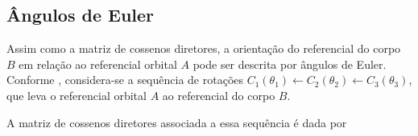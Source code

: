 





\subsection{Ângulos de Euler}
\label{sec_angulos_euler}

Assim como a matriz de cossenos diretores, a orientação do referencial do corpo $B$ em relação ao referencial orbital $A$ pode ser descrita por ângulos de Euler. Conforme \cite{wie2008space}, considera-se a sequência de rotações $C_1(\theta_1)\leftarrow C_2(\theta_2)\leftarrow C_3(\theta_3)$, que leva o referencial orbital $A$ ao referencial do corpo $B$.

A matriz de cossenos diretores associada a essa sequência é dada por

